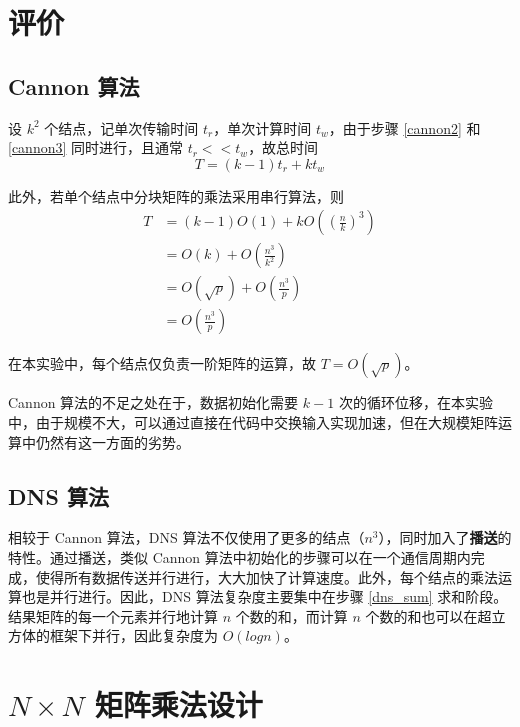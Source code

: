\documentclass{zjureport-zh}
\begin{document}
\section{评价}
\subsection{Cannon 算法}
\par 设 $k^2$ 个结点，记单次传输时间 $t_r$，单次计算时间 $t_w$，由于步骤 \ref{cannon2} 和 \ref{cannon3} 同时进行，且通常 $t_r << t_w$，故总时间
$$
	T = (k-1)t_r + kt_w
$$
\par 此外，若单个结点中分块矩阵的乘法采用串行算法，则
\begin{align*}
	T &= (k-1)O(1) + kO((\frac{n}{k})^3) \\
	  &= O(k) + O(\frac{n^3}{k^2}) \\
	  &= O(\sqrt{p}) + O(\frac{n^3}{p}) \\
	  &= O(\frac{n^3}{p})
\end{align*}
\par 在本实验中，每个结点仅负责一阶矩阵的运算，故 $T = O(\sqrt{p})$。
\par Cannon 算法的不足之处在于，数据初始化需要 $k-1$ 次的循环位移，在本实验中，由于规模不大，可以通过直接在代码中交换输入实现加速，但在大规模矩阵运算中仍然有这一方面的劣势。

\subsection{DNS 算法}
\par 相较于 Cannon 算法，DNS 算法不仅使用了更多的结点（$n^3$），同时加入了\textbf{播送}的特性。通过播送，类似 Cannon 算法中初始化的步骤可以在一个通信周期内完成，使得所有数据传送并行进行，大大加快了计算速度。此外，每个结点的乘法运算也是并行进行。因此，DNS 算法复杂度主要集中在步骤 \ref{dns_sum} 求和阶段。结果矩阵的每一个元素并行地计算 $n$ 个数的和，而计算 $n$ 个数的和也可以在超立方体的框架下并行，因此复杂度为 $O(logn)$。

\section{$N \times N$ 矩阵乘法设计}
\end{document}
